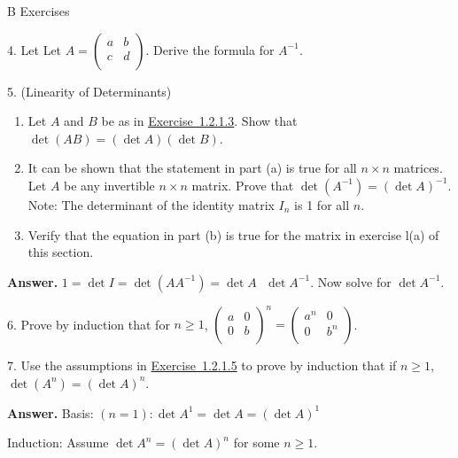 \documentclass[10pt,]{book}
\theoremstyle{plain}
\theoremstyle{definition}
\theoremstyle{definition}
\theoremstyle{definition}
\theoremstyle{definition}
\begin{document}
\par\smallskip\noindent
\hypertarget{exercisegroup-4}{}\typeout{************************************************}
\typeout{************************************************}
B Exercises%
\begin{exercisegroup}
\item[4.]\hypertarget{exercise-11}{} Let Let \(A =\left(
\begin{array}{cc}
 a & b \\
 c & d \\
\end{array}
\right)\). Derive the formula for \(A^{-1}\).%
\par\smallskip
\item[5.]\hypertarget{prob-5-2-5}{}(Linearity of Determinants)\space\space{}\leavevmode%
\begin{enumerate}[label=\alph*]
\item\hypertarget{li-64}{}Let \(A\) and \(B\) be as in \hyperlink{prob-5-2-3}{Exercise~1.2.1.3}. Show that \(\det (A B) =(\det  A)(\det  B)\).
%
\item\hypertarget{li-65}{} It can be shown that the statement in part (a) is true for all \(n\times n\) matrices. Let \(A\) be any invertible \(n\times n\) matrix. Prove that \(\det \left(A^{-1}\right) =(\det  A)^{-1}\). Note: The determinant of the identity matrix \(I_n\) is 1 for all \(n\).
%
\item\hypertarget{li-66}{} Verify that the equation in part (b) is true for the matrix in exercise l(a) of this section.
%
\end{enumerate}
%
\par\smallskip
\par\smallskip
\noindent\textbf{Answer.}\hypertarget{answer-7}{}\quad
 \(1=\det  I=\det \left(AA^{-1}\right)=\det  A\text{  }\det  A^{-1}\). Now solve for \(\det  A^{-1}\). 
%
\item[6.]\hypertarget{exercise-13}{} Prove by induction that for \(n \geq 1\), \(\left(
\begin{array}{cc}
 a & 0 \\
 0 & b \\
\end{array}
\right)^n= \left(
\begin{array}{cc}
 a^n & 0 \\
 0 & b^n \\
\end{array}
\right)\).
%
\par\smallskip
\item[7.]\hypertarget{exercise-14}{} Use the assumptions in \hyperlink{prob-5-2-5}{Exercise~1.2.1.5} to prove by induction that if \(n \geq 1\), \(\det \left(A^n\right) = (\det  A)^n\).%
\par\smallskip
\par\smallskip
\noindent\textbf{Answer.}\hypertarget{answer-8}{}\quad
Basis: \((n=1): \det  A^1=\det  A =(\det  A )^1\)%
\par
Induction: Assume \(\det  A^n=(\det  A)^n\) for some \(n\geq 1\).%
\par


\end{exercisegroup}
\end{document}
